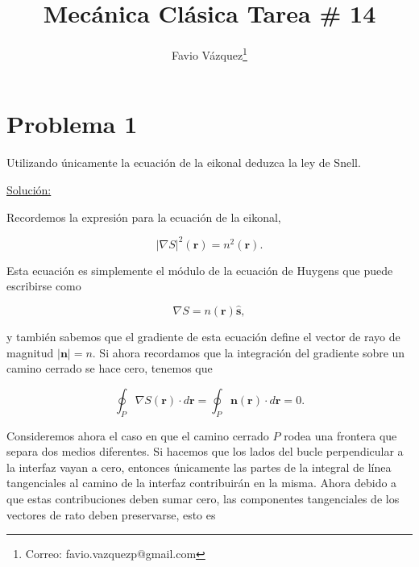 \documentclass[a4paper,10pt]{article}
\title{Mecánica Clásica Tarea \# 14}
\author{Favio Vázquez\thanks{Correo: favio.vazquezp@gmail.com}}\affil{Instituto de Ciencias Nucleares. Universidad Nacional Autónoma de México.}
\date{}
\numberwithin{equation}{section}
\begin{document}
\makeatletter
\def\@maketitle{%
  \newpage
  \null
  \vskip 2em%
  \begin{center}%
  \let \footnote \thanks
    {\Large\bfseries \@title \par}%
    \vskip 1.5em%
    {\normalsize
      \lineskip .5em%
      \begin{tabular}[t]{c}%
        \@author
      \end{tabular}\par}%
    \vskip 1em%
    {\normalsize \@date}%
  \end{center}%
  \par
  \vskip 1.5em}
\makeatother

\maketitle

\section{Problema 1}

Utilizando únicamente la ecuación de la eikonal deduzca la ley de Snell.

\vspace{.3cm}

\underline{Solución:} \vspace{.3cm}

Recordemos la expresión para la ecuación de la eikonal,

\begin{equation}
 |\nabla S|^2(\mathbf{r}) = n^2(\mathbf{r}).
\end{equation}

Esta ecuación es simplemente el módulo de la ecuación de Huygens que puede 
escribirse como 

\begin{equation}
 \nabla S = n(\mathbf{r})\hat{\mathbf{s}},
\end{equation}

y también sabemos que el gradiente de esta ecuación define el vector de rayo de 
magnitud $|\mathbf{n}| = n$. Si ahora recordamos que la integración del gradiente 
sobre un camino cerrado se hace cero, tenemos que 

\begin{equation}
\oint_P \nabla S(\mathbf{r}) \cdot d\mathbf{r} = \oint_P \mathbf{n}(\mathbf{r}) 
\cdot d\mathbf{r} = 0.
\end{equation}

Consideremos ahora el caso en que el camino cerrado $P$ rodea una frontera que 
separa dos medios diferentes. Si hacemos que los lados del bucle perpendicular 
a la interfaz vayan a cero, entonces únicamente las partes de la integral de línea 
tangenciales al camino de la interfaz contribuirán en la misma. Ahora debido a que 
estas contribuciones deben sumar cero, las componentes tangenciales de los vectores 
de rato deben preservarse, esto es 
\end{document}
